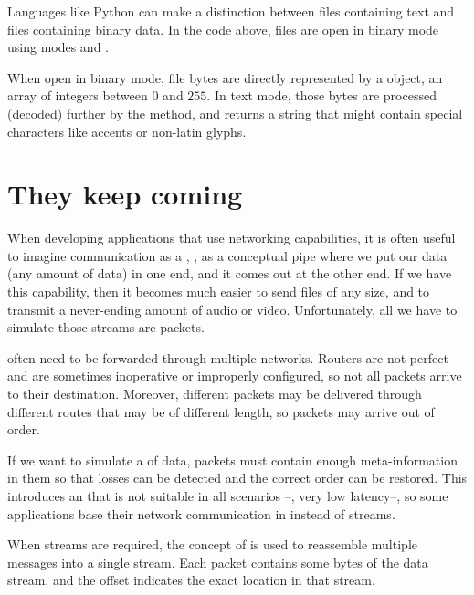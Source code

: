 \begin{remark}
Languages like Python can make a distinction between files containing text and files containing binary data.
In the code above, files are open in binary mode using modes  and .

When open in binary mode, file bytes are directly represented by a  object, an array of 
integers between $0$ and $255$. In text mode, those bytes are processed (decoded) further by the  method,
and returns a string that might contain special characters like accents or non-latin glyphs. 
\end{remark}

\section{They keep coming}\label{sec:packets:stream}

When developing applications that use networking capabilities, it is often useful 
to imagine communication as a , \ie, as a conceptual pipe where we put 
our data (any amount of data) in one end, and it comes out at the other end. If we have
this capability, then it becomes much easier to send files of any size, and to transmit a never-ending
amount of audio or video. Unfortunately, all we have to simulate those streams are packets.

 often need to be forwarded through multiple networks. Routers are not perfect
and are sometimes inoperative or improperly configured, so not all packets arrive to their destination. Moreover,
different packets may be delivered through different routes that may be of different length, so packets may arrive
out of order.

If we want to simulate a  of data, packets must contain enough meta-information in them so that losses can be detected and 
the correct order can be restored. This introduces an  that is not suitable in all scenarios --\eg, very low latency--,
so some applications base their network communication in  instead of streams.

When streams are required, the concept of  is used to reassemble multiple messages into 
a single stream. Each packet contains some bytes of the data stream, and the offset indicates the exact location in that stream.

